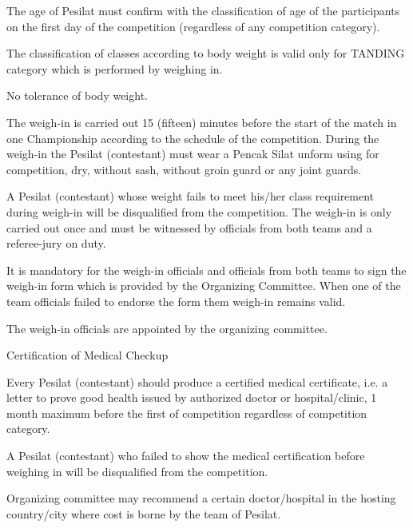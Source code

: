 \begin{legal}
\item The age of Pesilat must confirm with the classification of age of the participants on the first day of the competition (regardless of any competition category).

\item The classification of classes according to body weight is valid only for TANDING category which is performed by weighing in.

    \begin{legal}
    \item No tolerance of body weight.
    \item The weigh-in is carried out 15 (fifteen) minutes before the start of the match in one Championship according to the schedule of the competition.
During the weigh-in the Pesilat (contestant) must wear a Pencak Silat unform using for competition, dry, without sash, without groin guard or any joint guards.
    \item A Pesilat (contestant) whose weight fails to meet his/her class requirement during weigh-in will be disqualified from the competition.  
The weigh-in is only carried out once and must be witnessed by officials from both teams and a referee-jury on duty. 
    \item It is mandatory for the weigh-in officials and officials from both teams to sign the weigh-in form which is provided by the Organizing Committee. When one of the team officials failed to endorse the form them weigh-in remains valid.
    \item The weigh-in officials are appointed by the organizing committee.
    \end{legal}

\item Certification of Medical Checkup
    \begin{legal}
    \item Every Pesilat (contestant) should produce a certified medical certificate, i.e. a letter to prove good health issued by authorized doctor or hospital/clinic, 1 month maximum before the first of competition regardless of competition category. 
    \item A Pesilat (contestant) who failed to show the medical certification before weighing in will be disqualified from the competition. 
    \end{legal}
    Organizing committee may recommend a certain doctor/hospital in the hosting country/city where cost is borne by the team of Pesilat. 
\end{legal}


